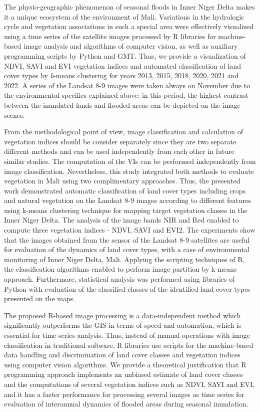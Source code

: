 \documentclass[12pt,a4paper,oneside]{article}
\def \newpar{\vspace{6pt}}
\begin{document}
\newpar The physio-geographic phenomenon of seasonal floods in Inner Niger Delta makes it a unique ecosystem of the environment of Mali. Variations in the hydrologic cycle and vegetation associations in such a special area were effectively visualized using a time series of the satellite images processed by R libraries for machine-based image analysis and algorithms of computer vision, as well as auxiliary programming scripts by Python and GMT. Thus, we provide a visualization of NDVI, SAVI and EVI vegetation indices and automated classification of land cover types by \emph{k}-means clustering for years 2013, 2015, 2018, 2020, 2021 and 2022. A series of the Landsat 8-9 images were taken always on November due to the environmental specifics explained above: in this period, the highest contrast between the inundated lands and flooded areas can be depicted on the image scenes. 

\newpar From the methodological point of view, image classification and calculation of vegetation indices should be consider separately since they are two separate different methods and can be used independently from each other in future similar studies. The computation of the VIs can be performed independently from image classification. Nevertheless, this study integrated both methods to evaluate vegetation in Mali using two complimentary approaches. Thus, the presented work demonstrated automatic classification of land cover types including crops and natural vegetation on the Landsat 8-9 images according to different features using k-means clustering technique for mapping target vegetation classes in the Inner Niger Delta. The analysis of the image bands NIR and Red enabled to compute three vegetation indices - NDVI, SAVI and EVI2. The experiments show that the images obtained from the sensor of the Landsat 8-9 satellites are useful for evaluation of the dynamics of land cover types, with a case of environmental monitoring of Inner Niger Delta, Mali. Applying the scripting techniques of R, the classification algorithms enabled to perform image partition by k-means approach. Furthermore, statistical analysis was performed using libraries of Python with evaluation of the classified classes of the identified land cover types presented on the maps.

\newpar The proposed R-based image processing is a data-independent method which significantly outperforms the GIS in terms of speed and automation, which is essential for time series analysis. Thus, instead of manual operations with image classification in traditional software, R libraries use scripts for the machine-based data handling and discrimination of land cover classes and vegetation indices using computer vision algorithms. We provide a theoretical justification that R programming approach implements an unbiased estimate of land cover classes and the computations of several vegetation indices such as NDVI, SAVI and EVI, and it has a faster performance for processing several images as time series for evaluation of interannual dynamics of flooded areas during seasonal inundation. 
\end{document}

